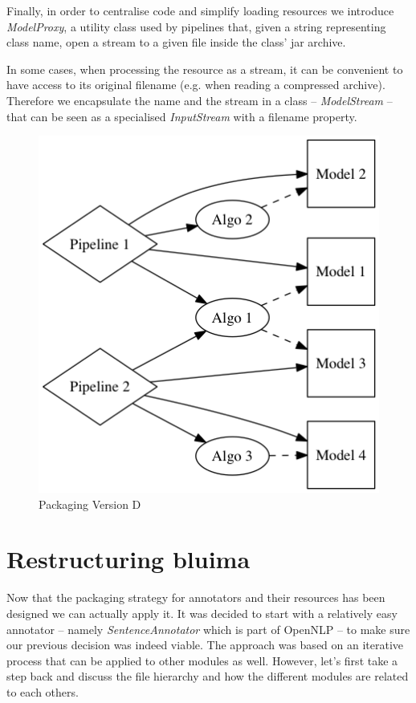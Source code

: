 \documentclass{article}
\newcommand{\id}[1]{\mbox{\textit{#1}}}
\begin{document}
Finally, in order to centralise code and simplify loading resources we introduce \id{ModelProxy}, a utility class used by pipelines that, given a string representing class name, open a stream to a given file inside the class' jar archive.

In some cases, when processing the resource as a stream, it can be convenient to have access to its original filename (e.g. when reading a compressed archive). Therefore we encapsulate the name and the stream in a class -- \id{ModelStream} -- that can be seen as a specialised \id{InputStream} with a filename property.

\begin{figure}
\centering
\includegraphics{res/packaging_version_D.png}
\caption{Packaging Version D}
\label{fig:pkgsysD}
\end{figure}


\section{Restructuring bluima}
\label{sec:restructuring_bluima}

Now that the packaging strategy for annotators and their resources has been designed we can actually apply it. It was decided to start with a relatively easy annotator -- namely \id{SentenceAnnotator} which is part of OpenNLP -- to make sure our previous decision was indeed viable. The approach was based on an iterative process that can be applied to other modules as well. However, let's first take a step back and discuss the file hierarchy and how the different modules are related to each others.
\end{document}
